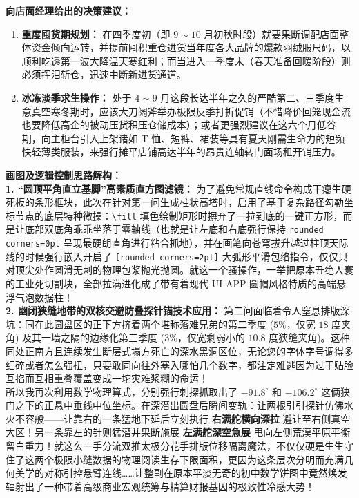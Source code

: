 \vspace{0.2cm}
\textbf{向店面经理给出的决策建议：}
\begin{enumerate}
    \item \textbf{重度囤货期规划：} 在四季度初（即 $9{\sim}10$ 月初秋时段）就要果断调配店面整体资金倾向运转，并提前囤积重仓进货当年度各大品牌的爆款羽绒服尺码，以顺利吃透第一波大降温天寒红利；而当进入一季度末（春天准备回暖阶段）则必须挥泪斩仓，迅速中断新进货通道。
    \item \textbf{冰冻淡季求生操作：} 处于 $4 \sim 9$ 月这段长达半年之久的严酷第二、三季度生意真空寒冬期时，应该大刀阔斧举办极限反季打折促销（不惜降价回笼现金流也要降低高企的被动压货积压仓储成本）；或者更强烈建议在这六个月低谷期，向主柜台引入上架诸如 T 恤、短裤、裙装等具有夏天刚需生命力的短频快轻薄类服装，来强行摊平店铺高达半年的昂贵连轴转门面场租开销压力。
\end{enumerate}

\vspace{0.6cm}

{\small\color{blue!70!black}
\textbf{画图及逻辑控制思路解构：}\\
\textbf{1. “圆顶平角直立基脚”高素质直方图滤镜：} 为了避免常规直线命令构成干瘪生硬死板的条形框块，此次在针对第一问生成柱状高塔时，启用了基于复杂路径勾勒坐标节点的底层特种微操：\texttt{\textbackslash fill} 填色绘制矩形时摒弃了一拉到底的一键正方形，而是让底部双底角乖乖坐落于零轴线（也就是让左底和右底强行保持 \texttt{rounded corners=0pt} 呈现最硬朗直角进行粘合抓地），并在画笔向苍穹拔升越过柱顶天际线的时候强行嵌入开启了 \texttt{[rounded corners=2pt]} 大弧形平滑包络指令，仅仅只对顶尖处作圆滑无刺的物理包浆抛光抛圆。就这一个骚操作，一举把原本丑绝人寰的工业死切割块，全部拉满进化成了带有着现代 UI APP 圆帽风格特质的高端悬浮气泡数据柱！\\
\textbf{2. 幽闭狭缝地带的双核交避防叠探针锚技术应用：} 第二问面临着令人窒息排版深坑：同在此圆盘区的正下方挤着两个堪称落难兄弟的第二季度 ($5\%$，仅宽 $18$ 度夹角) 及其一墙之隔的边缘化第三季度 ($3\%$，仅宽剩弱小的 $10.8$ 度狭缝夹角)。这种同处正南方且连续发生断层式塌方死亡的深水黑洞区位，无论您的字体字号调得多细碎或者怎么强扭，只要敢同向往外塞入哪怕几个数字，都注定难逃因为过于贴脸互掐而互相重叠覆盖变成一坨灾难浆糊的命运！\\
所以我再次利用数学物理算式，分别强行刺探抓取出了 $-91.8^\circ$ 和 $-106.2^\circ$ 这俩狭门之下的正悬中垂线中位坐标。在深潜出圆盘后瞬间变轨：让两根引引探针仿佛水火不容般——让靠右的一条猛地下延后立刻执行 \textbf{右满舵横向深拉} 避让至右侧真空大区！另一条靠左的针则猛潜并果断施展 \textbf{左满舵深空急展} 甩向左侧荒漠平原平衡留白重力！就这么一手分流双推太极分花手排版位移隔离魔法，不仅仅硬是生生守住了这两个极限小缝数据的物理阅读生存下限面积，更因为这条层次分明而充满几何美学的对称引控悬臂连线……让整副在原本平淡无奇的初中数学饼图中竟然焕发辐射出了一种带着高级商业宏观统筹与精算财报基因的极致性冷感大势！
}

